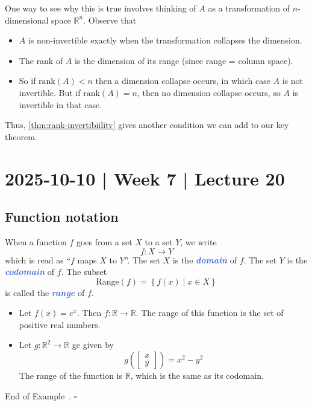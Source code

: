 \documentclass[10pt]{article}
\newcommand{\demph}[1]{\textcolor{RoyalBlue}{\textbf{\slshape #1}}} %
\theoremstyle{definition}
\newtheorem{example}[theorem]{Example}
\renewenvironment{example}
{\begin{oldexample}}
  {\par\smallskip\hfill   End of Example~\theexample. $\square$    \par\end{oldexample}}
\newcommand{\R}{\mathbb{R}}           %
\begin{document}
One way to see why this is true involves thinking of $A$ as a transformation
of $n$-dimensional space $\R^{n}$. Observe that
\begin{itemize}
  \item $A$ is non-invertible exactly when the transformation collapses the dimension.
  \item The rank of $A$ is the dimension of its range (since range = 
  column space).
  \item So if $\text{rank}(A)<n$ then a dimension collapse occurs, in which
  case $A$ is not invertible. But if $\text{rank}(A)=n$, then no dimension
  collapse occurs, so $A$ is invertible in that case.
\end{itemize}


Thus, \cref{thm:rank-invertibiility} gives another condition we can add to our
key theorem.

\newpage
\section{2025-10-10 | Week 7 | Lecture 20}


\subsection{Function notation}

When a function $f$ goes from a set $X$ to a set $Y$, we write
\begin{equation*}
  f:X \to Y
\end{equation*}
which is read as ``$f$ maps $X$ to $Y$''. The set $X$ is the \demph{domain} of
$f$. The set $Y$ is the \demph{codomain} of $f$. The subset
\begin{equation*}
  \mathrm{Range}(f) = \left\{f(x)\mid x\in X\right\} 
\end{equation*}
is called the \demph{range} of $f$.

\begin{example}
  \begin{itemize}
    \item Let $f(x) = e^{x}$. Then $f: \R \to \R$. The range of this function is the
    set of positive real numbers.
    \item Let $g: \R^{2} \to \R$ ge given by
    \begin{equation*}
      g \left(
        \begin{bmatrix}
          x\\y
        \end{bmatrix}
      \right)  = x^{2}-y^{2}
    \end{equation*}
    The range of the function is $\R$, which is the same as its codomain.
  \end{itemize}
\end{example}
\end{document}
